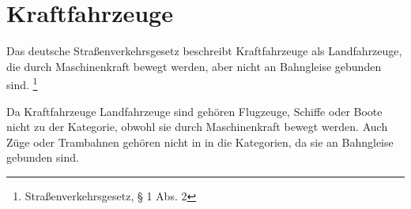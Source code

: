 \section{Kraftfahrzeuge}
Das deutsche Straßenverkehrsgesetz beschreibt Kraftfahrzeuge als Landfahrzeuge, die durch Maschinenkraft bewegt werden, aber nicht an Bahngleise gebunden sind.
\footnote{Straßenverkehrsgesetz, § 1 Abs. 2}

Da Kraftfahrzeuge Landfahrzeuge sind gehören Flugzeuge, Schiffe oder Boote nicht zu der Kategorie, obwohl sie durch Maschinenkraft bewegt werden.
Auch Züge oder Trambahnen gehören nicht in in die Kategorien, da sie an Bahngleise gebunden sind.








